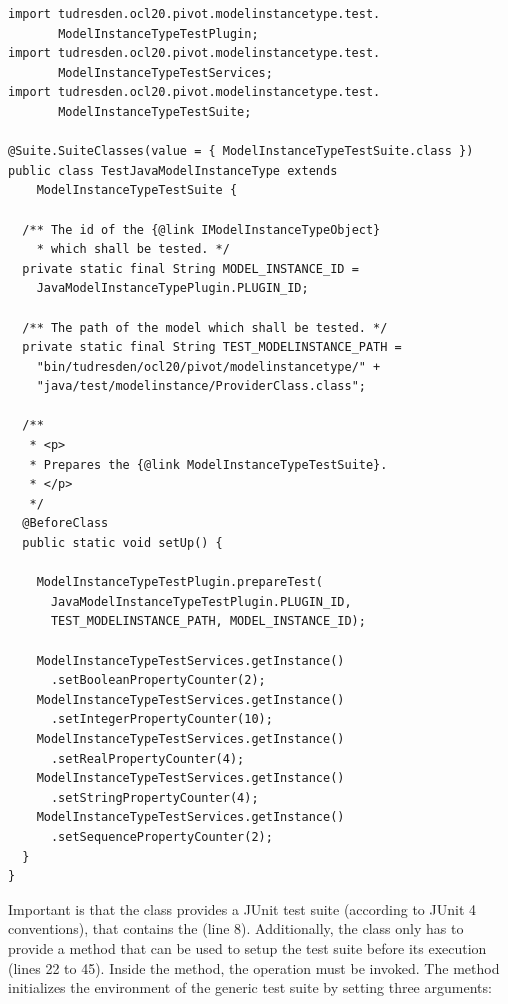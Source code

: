 \lstset{
  language=Java
}
\begin{lstlisting}[caption={An instantiation of the generic model instance test suite.}, captionpos=b, label=list:modelInstanceTestSuite:constraints01, float]
import tudresden.ocl20.pivot.modelinstancetype.test.
       ModelInstanceTypeTestPlugin;
import tudresden.ocl20.pivot.modelinstancetype.test.
       ModelInstanceTypeTestServices;
import tudresden.ocl20.pivot.modelinstancetype.test.
       ModelInstanceTypeTestSuite;

@Suite.SuiteClasses(value = { ModelInstanceTypeTestSuite.class })
public class TestJavaModelInstanceType extends 
    ModelInstanceTypeTestSuite {

  /** The id of the {@link IModelInstanceTypeObject} 
    * which shall be tested. */
  private static final String MODEL_INSTANCE_ID =
    JavaModelInstanceTypePlugin.PLUGIN_ID;

  /** The path of the model which shall be tested. */
  private static final String TEST_MODELINSTANCE_PATH =
    "bin/tudresden/ocl20/pivot/modelinstancetype/" +
    "java/test/modelinstance/ProviderClass.class";

  /**
   * <p>
   * Prepares the {@link ModelInstanceTypeTestSuite}.
   * </p>
   */
  @BeforeClass
  public static void setUp() {

    ModelInstanceTypeTestPlugin.prepareTest(
      JavaModelInstanceTypeTestPlugin.PLUGIN_ID, 
      TEST_MODELINSTANCE_PATH, MODEL_INSTANCE_ID);

    ModelInstanceTypeTestServices.getInstance()
      .setBooleanPropertyCounter(2);
    ModelInstanceTypeTestServices.getInstance()
      .setIntegerPropertyCounter(10);
    ModelInstanceTypeTestServices.getInstance()
      .setRealPropertyCounter(4);
    ModelInstanceTypeTestServices.getInstance()
      .setStringPropertyCounter(4);
    ModelInstanceTypeTestServices.getInstance()
      .setSequencePropertyCounter(2);
  }
}
\end{lstlisting}

Important is that the class provides a JUnit test suite (according to JUnit 4 
conventions), that contains the  (line 8). 
Additionally, the class only has to provide a  method that can be 
used to setup the test suite before its execution (lines 22 to 45). Inside the 
 method, the operation 
 must be 
invoked. The method initializes the environment of the generic test suite by 
setting three arguments:

